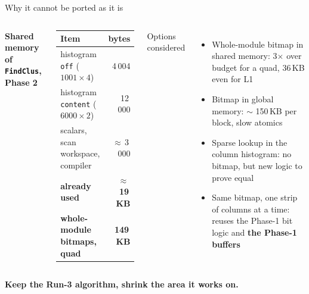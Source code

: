 \documentclass[aspectratio=169,10pt,xcolor=table]{beamer}
\newcommand{\pos}[1]{\textcolor{cbBlue}{#1}}
\newcommand{\con}[1]{\textcolor{cbOrange}{#1}}
\newcommand{\takeaway}[1]{\begin{center}\color{cmsblue}\textbf{#1}\end{center}}
\newcommand{\code}[1]{\texttt{\small #1}}
\begin{document}
\begin{frame}{Why it cannot be ported as it is}
  \begin{columns}[T]
    \textbf{Shared memory of \code{FindClus}, Phase 2}
    \vspace{4pt}
    \begin{center}\small
    \begin{tabular}{@{}lr@{}}
      \toprule
      Item & bytes \\
      \midrule
      histogram \code{off} ($1001\times4$) & 4\,004 \\
      histogram \code{content} ($6000\times2$) & 12\,000 \\
      scalars, scan workspace, compiler & $\approx$\,3\,000 \\
      \midrule
      \textbf{already used} & $\approx$\,\textbf{19\,KB} \\
      \textbf{whole-module bitmaps, quad} & \con{\textbf{149\,KB}} \\
      \bottomrule
    \end{tabular}
    \end{center}
    Options considered
    \begin{itemize}
      \item \con{Whole-module bitmap in shared memory}: 3$\times$ over budget for a quad, 36\,KB even for L1
      \item \con{Bitmap in global memory}: $\sim$ 150\,KB per block, slow atomics
      \item \con{Sparse lookup in the column histogram}: no bitmap, but new logic to prove equal
      \item \pos{Same bitmap, one strip of columns at a time}: reuses the Phase-1 bit logic and \textbf{the Phase-1 buffers}
    \end{itemize}
  \end{columns}
  \takeaway{Keep the Run-3 algorithm, shrink the area it works on.}
\end{frame}
\end{document}

